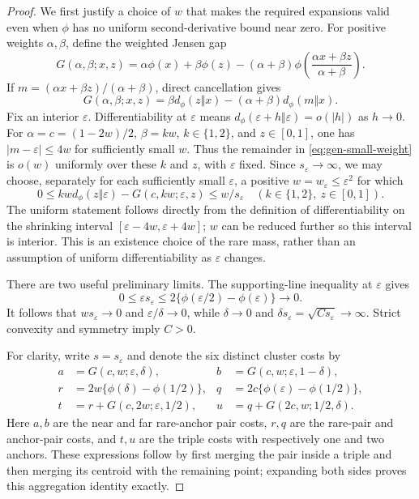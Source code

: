 \begin{proof}
We first justify a choice of $w$ that makes the required expansions
valid even when $\phi$ has no uniform second-derivative bound near
zero. For positive weights $\alpha,\beta$, define the weighted Jensen
gap
\[
 G(\alpha,\beta;x,z)
 =\alpha\phi(x)+\beta\phi(z)
  -(\alpha+\beta)\phi\left(
       \frac{\alpha x+\beta z}{\alpha+\beta}\right).
\]
If $m=(\alpha x+\beta z)/(\alpha+\beta)$, direct cancellation gives
\begin{equation}
 G(\alpha,\beta;x,z)
  =\beta d_\phi(z\Vert x)
       -(\alpha+\beta)d_\phi(m\Vert x).
 \label{eq:gen-small-weight}
\end{equation}
Fix an interior $\varepsilon$. Differentiability at $\varepsilon$
means
$d_\phi(\varepsilon+h\Vert\varepsilon)=o(|h|)$ as $h\to0$.
For $\alpha=c=(1-2w)/2$, $\beta=kw$, $k\in\{1,2\}$, and
$z\in[0,1]$, one has $|m-\varepsilon|\le4w$ for sufficiently
small $w$. Thus the remainder in \eqref{eq:gen-small-weight} is
$o(w)$ uniformly over these $k$ and $z$, with $\varepsilon$ fixed.
Since $s_\varepsilon\to\infty$, we may choose, separately for each
sufficiently small $\varepsilon$, a positive
$w=w_\varepsilon\le\varepsilon^2$ for which
\begin{equation}
 0\le
 kwd_\phi(z\Vert\varepsilon)
  -G(c,kw;\varepsilon,z)
 \le w/s_\varepsilon
 \quad
 (k\in\{1,2\},\ z\in[0,1]).
 \label{eq:gen-remainder-choice}
\end{equation}
The uniform statement follows directly from the definition of
differentiability on the shrinking interval
$[\varepsilon-4w,\varepsilon+4w]$; $w$ can be reduced further so
this interval is interior. This is an existence choice of the rare
mass, rather than an assumption of uniform differentiability as
$\varepsilon$ changes.

There are two useful preliminary limits. The supporting-line
inequality at $\varepsilon$ gives
\[
 0\le\varepsilon s_\varepsilon
 \le2\{\phi(\varepsilon/2)-\phi(\varepsilon)\}
 \longrightarrow0.
\]
It follows that $ws_\varepsilon\to0$ and
$\varepsilon/\delta\to0$, while
$\delta\to0$ and $\delta s_\varepsilon=\sqrt{Cs_\varepsilon}
\to\infty$. Strict convexity and symmetry imply $C>0$.

For clarity, write $s=s_\varepsilon$ and denote the six distinct
cluster costs by
\begin{align*}
 a&=G(c,w;\varepsilon,\delta),
 &b&=G(c,w;\varepsilon,1-\delta),\\
 r&=2w\{\phi(\delta)-\phi(1/2)\},
 &q&=2c\{\phi(\varepsilon)-\phi(1/2)\},\\
 t&=r+G(c,2w;\varepsilon,1/2),
 &u&=q+G(2c,w;1/2,\delta).
\end{align*}
Here $a,b$ are the near and far rare-anchor pair costs, $r,q$ are
the rare-pair and anchor-pair costs, and $t,u$ are the triple costs
with respectively one and two anchors. These expressions follow by
first merging the pair inside a triple and then merging its
centroid with the remaining point; expanding both sides proves
this aggregation identity exactly.


\end{proof}
